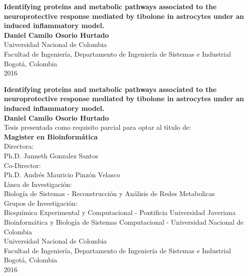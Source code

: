 \begin{center}
\begin{figure}
\centering%
%
\end{figure}
\thispagestyle{empty} \vspace*{2.0cm} \textbf{\huge
Identifying proteins and metabolic pathways associated to the neuroprotective response mediated by tibolone in astrocytes under an induced inflammatory model.}\\[3.0cm]
\Large\textbf{Daniel Camilo Osorio Hurtado}\\[6.0cm]
\small Universidad Nacional de Colombia\\
Facultad de Ingeniería, Departamento de Ingeniería de Sistemas e Industrial\\
Bogotá, Colombia\\
2016\\
\end{center}

\newpage{\pagestyle{empty}\cleardoublepage}

\newpage
\begin{center}
\thispagestyle{empty} \vspace*{0cm} \textbf{\huge
Identifying proteins and metabolic pathways associated to the neuroprotective response mediated by tibolone in astrocytes under an induced inflammatory model.}\\[2.0cm]
\Large\textbf{Daniel Camilo Osorio Hurtado}\\[2.0cm]
\small Tesis presentada como requisito parcial para optar al
t\'{\i}tulo de:\\
\textbf{Magister en Bioinformática}\\[1.5cm]
Directora:\\
Ph.D. Janneth Gonzalez Santos\\[0.7cm]
Co-Director:\\
Ph.D. Andrés Mauricio Pinzón Velasco\\[1.5cm]
L\'{\i}nea de Investigaci\'{o}n:\\
Biolog\'ia de Sistemas - Reconstrucción y Análisis de Redes Metabolicas \\
Grupos de Investigaci\'{o}n:\\
Bioquímica Experimental y Computacional - Pontificia Universidad Javeriana \\
Bioinformática y Biología de Sistemas Computacional - Universidad Nacional de Colombia\\[1.7cm]
Universidad Nacional de Colombia\\
Facultad de Ingeniería, Departamento de Ingeniería de Sistemas e Industrial\\
Bogotá, Colombia\\
2016
\end{center}
\newpage{\pagestyle{empty}\cleardoublepage}
